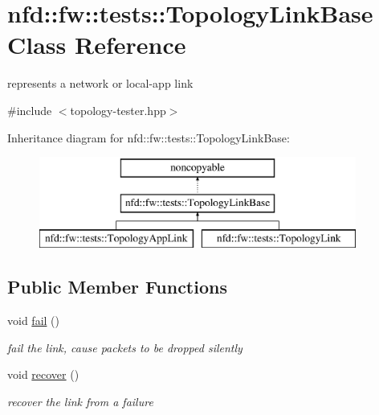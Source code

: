 \hypertarget{classnfd_1_1fw_1_1tests_1_1TopologyLinkBase}{}\section{nfd\+:\+:fw\+:\+:tests\+:\+:Topology\+Link\+Base Class Reference}
\label{classnfd_1_1fw_1_1tests_1_1TopologyLinkBase}


represents a network or local-\/app link  




{\ttfamily \#include $<$topology-\/tester.\+hpp$>$}

Inheritance diagram for nfd\+:\+:fw\+:\+:tests\+:\+:Topology\+Link\+Base\+:\begin{figure}[H]
\begin{center}
\leavevmode
\includegraphics[height=3.000000cm]{classnfd_1_1fw_1_1tests_1_1TopologyLinkBase}
\end{center}
\end{figure}
\subsection*{Public Member Functions}
\begin{DoxyCompactItemize}
\item 
void \hyperlink{classnfd_1_1fw_1_1tests_1_1TopologyLinkBase_abf8305a3116d2b8f1396a030a65d06be}{fail} ()\hypertarget{classnfd_1_1fw_1_1tests_1_1TopologyLinkBase_abf8305a3116d2b8f1396a030a65d06be}{}\label{classnfd_1_1fw_1_1tests_1_1TopologyLinkBase_abf8305a3116d2b8f1396a030a65d06be}

\begin{DoxyCompactList}\small\item\em fail the link, cause packets to be dropped silently \end{DoxyCompactList}\item 
void \hyperlink{classnfd_1_1fw_1_1tests_1_1TopologyLinkBase_aa4723a32abccfc1d37f125b512aa14d3}{recover} ()\hypertarget{classnfd_1_1fw_1_1tests_1_1TopologyLinkBase_aa4723a32abccfc1d37f125b512aa14d3}{}\label{classnfd_1_1fw_1_1tests_1_1TopologyLinkBase_aa4723a32abccfc1d37f125b512aa14d3}

\begin{DoxyCompactList}\small\item\em recover the link from a failure \end{DoxyCompactList}\end{DoxyCompactItemize}
